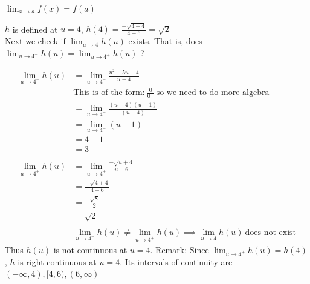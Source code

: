 \documentclass{ximera}
\begin{document}
\begin{problem}
\begin{enumerate}
\begin{explanation}
\begin{center}
    	  $\lim_{x \to a} f(x) = f(a)$
	\end{center}

$h$ is defined at $u=4$, $h(4)=\frac{-\sqrt{4+4}}{4 - 6}=\sqrt{2}$\\
Next we check if  $\lim_{u \to 4} h(u)$ exists.  That is, does $\lim_{u \to 4^-} h(u)=\lim_{u \to 4^+} h(u)$ ?

	\begin{align*}
	\lim_{u \to 4^-} h(u)&=\lim_{u \to 4^-}\frac{u^2-5u+4}{u - 4}\\
	& \text{This is of the form:}\ \frac{0}{0^-}\ \text{so we need to do more algebra}\\
	&=\lim_{u \to 4^-}\frac{(u-4)(u-1)}{(u-4)}\\
	&=\lim_{u \to 4^-}(u-1)\\
	&=4-1\\
	&=3 \\ \\
	\lim_{u \to 4^+} h(u)&=\lim_{u \to 4^+}\frac{-\sqrt{u+4}}{u - 6}\\
	&=\frac{-\sqrt{4+4}}{4 - 6}\\
	&=\frac{-\sqrt{8}}{-2}\\
	&=\sqrt{2}\\ \\
	&\lim_{u \to 4^-} h(u)\ne \lim_{u \to 4^+} h(u) \implies \lim_{u \to 4} h(u)\ \text{does not exist}
	\end{align*}
Thus $h(u)$ is not continuous at $u=4$. Remark: Since $\lim_{u \to 4^+} h(u)=h(4)$, $h$ is right continuous at $u=4$.   Its intervals of continuity are $(-\infty,4),[4,6),(6,\infty)$

	\end{explanation}



\end{enumerate}
\end{problem}
\end{document}
